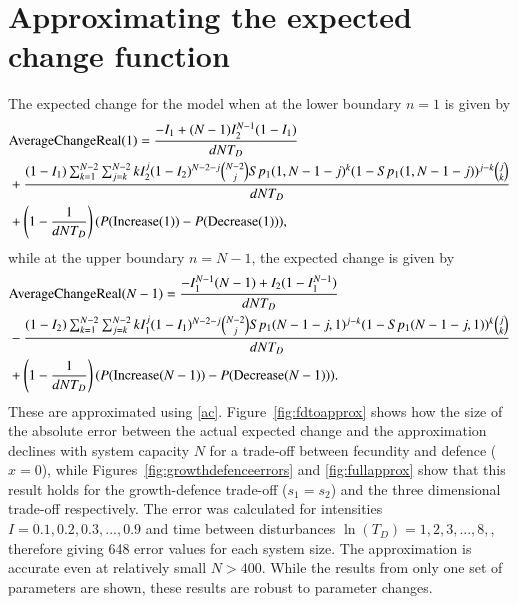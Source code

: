 \section{Approximating the expected change function}
 \label{appapproximations}
 The expected change for the model when at the lower boundary $n=1$ is given by
 \begin{align}
\label{acreal1difi}&\text{AverageChangeReal}(1)=\frac{-I_1+(N-1)I_2^{N-1}(1-I_1)}{dNT_D}\\
&+\frac{(1-I_1)\sum_{k=1}^{N-2}\sum_{j=k}^{N-2}k I_2^j(1-I_2)^{N-2-j}{N-2\choose j} Sp_1(1,N-1-j)^k(1-Sp_1(1,N-1-j))^{j-k} {j \choose k}}{dNT_D} \notag \\
 &+ \left(1-\frac{1}{dNT_D}\right)(P(\text{Increase}(1))-P(\text{Decrease}(1))), \notag
 \end{align}
 while at the upper boundary $n=N-1$, the expected change is given by
\begin{align}
 \label{acrealtotdifi}&\text{AverageChangeReal}(N-1)= \frac{-I_1^{N-1}(N-1) +I_2(1-I_1^{N-1})}{dNT_D} \\
 &-\frac{(1-I_2)\sum_{k=1}^{N-2}\sum_{j=k}^{N-2}k I_1^j(1-I_1)^{N-2-j}{N-2\choose j} Sp_1(N-1-j,1)^{j-k}(1-Sp_1(N-1-j,1))^{k} {j \choose k}}{dNT_D} \notag \\
 &+ \left(1-\frac{1}{dNT_D}\right)(P(\text{Increase}(N-1))-P(\text{Decrease}(N-1))). \notag
  \end{align} 
These are approximated using \eqref{ac}. Figure~\ref{fig:fdtoapprox} shows how the size of the absolute error between the actual expected change and the approximation declines with system capacity $N$ for a trade-off between fecundity and defence ($x=0$), while Figures~\ref{fig:growthdefenceerrors} and \ref{fig:fullapprox} show that this result holds for the growth-defence trade-off ($s_1=s_2$) and the three dimensional trade-off respectively. The error was calculated for intensities $I=0.1,0.2,0.3,...,0.9$ and time between disturbances $\ln(T_D)=1,2,3,...,8,$, therefore giving 648 error values for each system size. The approximation is accurate even at relatively small $N>400$. While the results from only one set of parameters are shown, these results are robust to parameter changes.

   
   
